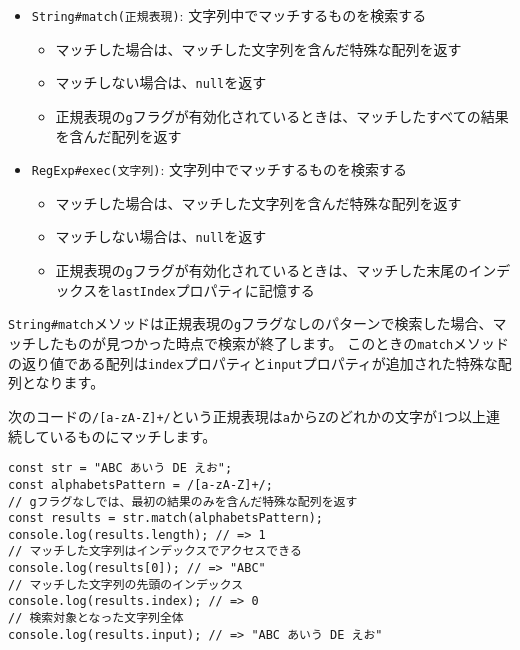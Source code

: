 \begin{itemize}
\item
  \texttt{String\#match(正規表現)}:
  文字列中でマッチするものを検索する

  \begin{itemize}
  \item
    マッチした場合は、マッチした文字列を含んだ特殊な配列を返す
  \item
    マッチしない場合は、\texttt{null}を返す
  \item
    正規表現の\texttt{g}フラグが有効化されているときは、マッチしたすべての結果を含んだ配列を返す
  \end{itemize}
\item
  \texttt{RegExp\#exec(文字列)}:
  文字列中でマッチするものを検索する

  \begin{itemize}
  \item
    マッチした場合は、マッチした文字列を含んだ特殊な配列を返す
  \item
    マッチしない場合は、\texttt{null}を返す
  \item
    正規表現の\texttt{g}フラグが有効化されているときは、マッチした末尾のインデックスを\texttt{lastIndex}プロパティに記憶する
  \end{itemize}
\end{itemize}

\texttt{String\#match}メソッドは正規表現の\texttt{g}フラグなしのパターンで検索した場合、マッチしたものが見つかった時点で検索が終了します。
このときの\texttt{match}メソッドの返り値である配列は\texttt{index}プロパティと\texttt{input}プロパティが追加された特殊な配列となります。

次のコードの\texttt{/[a-zA-Z]+/}という正規表現は\texttt{a}から\texttt{Z}のどれかの文字が1つ以上連続しているものにマッチします。

\begin{lstlisting}
const str = "ABC あいう DE えお";
const alphabetsPattern = /[a-zA-Z]+/;
// gフラグなしでは、最初の結果のみを含んだ特殊な配列を返す
const results = str.match(alphabetsPattern);
console.log(results.length); // => 1
// マッチした文字列はインデックスでアクセスできる
console.log(results[0]); // => "ABC"
// マッチした文字列の先頭のインデックス
console.log(results.index); // => 0
// 検索対象となった文字列全体
console.log(results.input); // => "ABC あいう DE えお"
\end{lstlisting}


